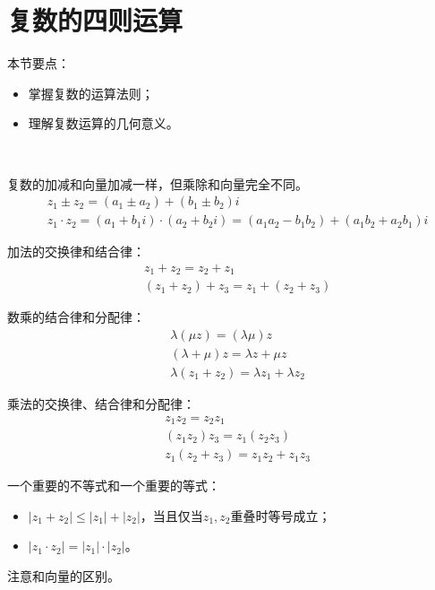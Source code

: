 \section{复数的四则运算}

本节要点：
\begin{itemize}
    \item 掌握复数的运算法则；
    \item 理解复数运算的几何意义。
\end{itemize}

~

复数的加减和向量加减一样，但乘除和向量完全不同。
\begin{align*}
&z_1\pm z_2=\left( a_1\pm a_2 \right) +\left( b_1\pm b_2 \right) i \\
&z_1\cdot z_2=\left( a_1+b_1i \right) \cdot \left( a_2+b_2i \right) =\left( a_1a_2-b_1b_2 \right) +\left( a_1b_2+a_2b_1 \right) i
\end{align*}

加法的交换律和结合律：
\begin{align*}
&z_1+z_2=z_2+z_1 \\
&\left( z_1+z_2 \right) +z_3=z_1+\left( z_2+z_3 \right)
\end{align*}

数乘的结合律和分配律：
\begin{align*}
&\lambda \left( \mu z \right) =\left( \lambda \mu \right) z \\
&\left( \lambda +\mu \right) z=\lambda z+\mu z \\
&\lambda \left( z_1+z_2 \right) =\lambda z_1+\lambda z_2
\end{align*}

乘法的交换律、结合律和分配律：
\begin{align*}
&z_1z_2=z_2z_1 \\
&\left( z_1z_2 \right) z_3=z_1\left( z_2z_3 \right) \\
&z_1\left( z_2+z_3 \right) =z_1z_2+z_1z_3
\end{align*}

一个重要的不等式和一个重要的等式：
\begin{itemize}
    \item $\left| z_1+z_2 \right|\leqslant \left| z_1 \right|+\left| z_2 \right|$，当且仅当$z_1,z_2$重叠时等号成立；
    \item $\left| z_1\cdot z_2 \right|=\left| z_1 \right|\cdot \left| z_2 \right|$。
\end{itemize}
注意和向量的区别。




